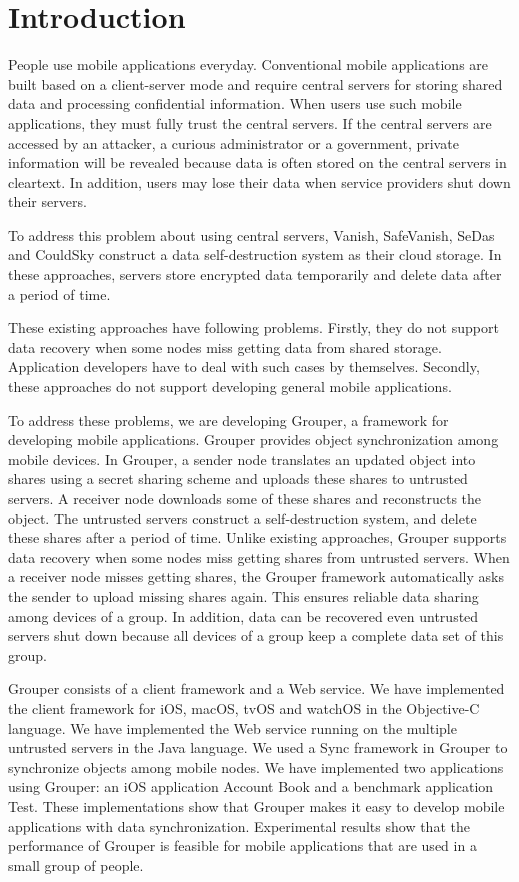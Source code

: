 \section{Introduction}

People use mobile applications everyday. 
Conventional mobile applications are built based on a client-server mode and require central servers for storing shared data and processing confidential information.
When users use such mobile applications, they must fully trust the central servers.
If the central servers are accessed by an attacker, a curious administrator or a government, private information will be revealed because data is often stored on the central servers in cleartext.
In addition, users may lose their data when service providers shut down their servers.

To address this problem about using central servers, Vanish\cite{geambasu2009vanish}, SafeVanish\cite{zeng2010safevanish}, SeDas\cite{zeng2012sedas} and CouldSky\cite{zeng2015cloudsky} construct a data self-destruction system as their cloud storage.
In these approaches, servers store encrypted data temporarily and delete data after a period of time.

These existing approaches have following problems.
Firstly, they do not support data recovery when some nodes miss getting data from shared storage.
Application developers have to deal with such cases by themselves.
Secondly, these approaches do not support developing general mobile applications.

To address these problems, we are developing Grouper, a framework for developing mobile applications. 
Grouper provides object synchronization among mobile devices.
In Grouper, a sender node translates an updated object into shares using a secret sharing scheme and uploads these shares to untrusted servers. 
A receiver node downloads some of these shares and reconstructs the object.
The untrusted servers construct a self-destruction system, and delete these shares after a period of time.
Unlike existing approaches, Grouper supports data recovery when some nodes miss getting shares from untrusted servers.
When a receiver node misses getting shares, the Grouper framework automatically asks the sender to upload missing shares again.
This ensures reliable data sharing among devices of a group.
In addition, data can be recovered even untrusted servers shut down because all devices of a group keep a complete data set of this group.

Grouper consists of a client framework and a Web service.
We have implemented the client framework for iOS, macOS, tvOS and watchOS in the Objective-C language.
We have implemented the Web service running on the multiple untrusted servers in the Java language.
We used a Sync\cite{sync} framework in Grouper to synchronize objects among mobile nodes.
We have implemented two applications using Grouper: an iOS application Account Book and a benchmark application Test.
These implementations show that Grouper makes it easy to develop mobile applications with data synchronization.
Experimental results show that the performance of Grouper is feasible for mobile applications that are used in a small group of people.

